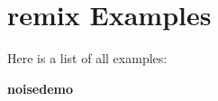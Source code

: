 \section{remix Examples}
Here is a list of all examples:\begin{CompactItemize}
\item 
{\bf noisedemo}
\end{CompactItemize}
